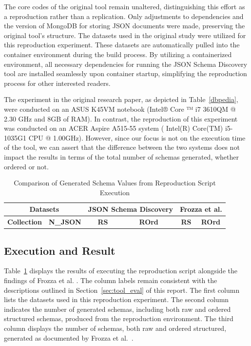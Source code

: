 \documentclass[sigconf, nonacm]{acmart}
\begin{document}
The core codes of the original tool remain unaltered, distinguishing this effort as a reproduction rather than a replication. Only adjustments to dependencies and the version of MongoDB for storing JSON documents were made, preserving the original tool's structure. The datasets used in the original study were utilized for this reproduction experiment. These datasets are automatically pulled into the container environment during the build process. By utilizing a containerized environment, all necessary dependencies for running the JSON Schema Discovery tool are installed seamlessly upon container startup, simplifying the reproduction process for other interested readers.

The experiment in the original research paper, as depicted in Table~\ref{dbpedia}, were conducted on an ASUS K45VM notebook (Intel® Core ™ i7 3610QM @ 2.30 GHz and 8GB of RAM)\cite{frozza2018approach}. In contrast, the reproduction of this experiment was conducted on an ACER Aspire A515-55 system ( Intel(R) Core(TM) i5-1035G1 CPU @ 1.00GHz). However, since our focus is not on the execution time of the tool, we can assert that the difference between the two systems does not impact the results in terms of the total number of schemas generated, whether ordered or not.

\begin{table}
\centering
\caption{Comparison of Generated Schema Values from Reproduction Script Execution} \label{reprod_latex}
\scalebox{0.80} {
\begin{tabular}{|l|c|c|c|c|c|}
\hline
\multicolumn{2}{|c|}{\textbf{Datasets}} & \multicolumn{2}{c|}{\textbf{JSON Schema Discovery}} &
\multicolumn{2}{c|}{\textbf{Frozza et al. \cite{frozza2018approach}}} \\
\hline
\textbf{Collection} & \textbf{N\_JSON} & \textbf{RS} & \textbf{ROrd} & \textbf{RS} & \textbf{ROrd} \\
\hline

\end{tabular}
}
\end{table}

\subsection{Execution and Result}
Table~\ref{reprod_latex} displays the results of executing the reproduction script alongside the findings of Frozza et al. \cite{frozza2018approach}. The column labels remain consistent with the descriptions outlined in Section~\ref{sec:tool_eval} of this report. 
The first column lists the datasets used in this reproduction experiment. The second column indicates the number of generated schemas, including both raw and ordered structured schemas, produced from the reproduction environment. The third column displays the number of schemas, both raw and ordered structured, generated as documented by Frozza et al.~\cite{frozza2018approach}.
\end{document}
